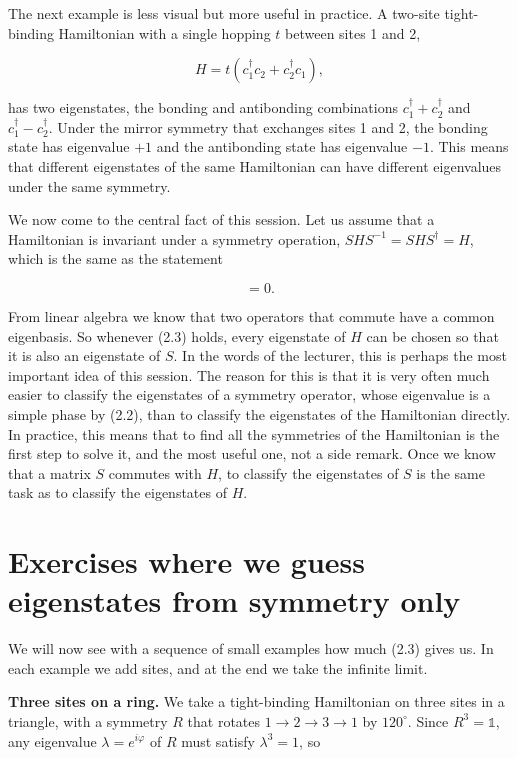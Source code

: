 The next example is less visual but more useful in practice. A two-site tight-binding Hamiltonian
with a single hopping $t$ between sites 1 and 2,

\begin{equation*}H = t\left(c_1^\dagger c_2 + c_2^\dagger c_1\right),\end{equation*}

has two eigenstates, the bonding and antibonding combinations $c_1^\dagger+c_2^\dagger$ and
$c_1^\dagger-c_2^\dagger$. Under the mirror symmetry that exchanges sites 1 and 2, the bonding state
has eigenvalue $+1$ and the antibonding state has eigenvalue $-1$. This means that different
eigenstates of the same Hamiltonian can have different eigenvalues under the same symmetry.

We now come to the central fact of this session. Let us assume that a Hamiltonian is invariant under
a symmetry operation, $SHS^{-1} = SHS^\dagger = H$, which is the same as the statement

\begin{equation}[H,S] = 0.\end{equation}

From linear algebra we know that two operators that commute have a common eigenbasis. So whenever
(2.3) holds, every eigenstate of $H$ can be chosen so that it is also an eigenstate of $S$. In the
words of the lecturer, this is perhaps the most important idea of this session. The reason for this
is that it is very often much easier to classify the eigenstates of a symmetry operator, whose
eigenvalue is a simple phase by (2.2), than to classify the eigenstates of the Hamiltonian directly.
In practice, this means that to find all the symmetries of the Hamiltonian is the first step to solve
it, and the most useful one, not a side remark. Once we know that a matrix $S$
commutes with $H$, to classify the eigenstates of $S$ is the same task as to classify the
eigenstates of $H$.

\section{Exercises where we guess eigenstates from symmetry only}

We will now see with a sequence of small examples how much (2.3) gives us. In each example we add
sites, and at the end we take the infinite limit.

\textbf{Three sites on a ring.} We take a tight-binding Hamiltonian on three sites in a triangle,
with a symmetry $R$ that rotates $1\to2\to3\to1$ by $120^\circ$. Since $R^3=\mathbb{1}$, any
eigenvalue $\lambda=e^{i\varphi}$ of $R$ must satisfy $\lambda^3=1$, so

